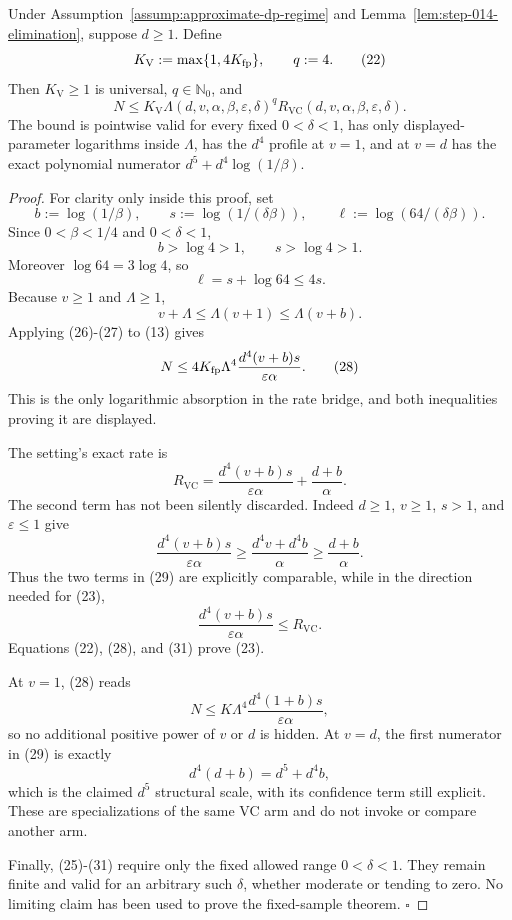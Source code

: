 \begin{proposition}\label{prop:step-014-rate}
Under Assumption~\ref{assump:approximate-dp-regime} and
Lemma~\ref{lem:step-014-elimination}, suppose \(d\geq1\). Define
\[
 K_{\mathrm V}:=\max\{1,4K_{\rm fp}\},
 \qquad q:=4.
\tag{22}
\]
Then \(K_{\mathrm V}\geq1\) is universal, \(q\in\mathbb N_0\), and
\[
 N\leq
 K_{\mathrm V}\Lambda(d,v,\alpha,\beta,\varepsilon,\delta)^q
 R_{\mathrm{VC}}(d,v,\alpha,\beta,\varepsilon,\delta).
\tag{23}
\]
The bound is pointwise valid for every fixed \(0<\delta<1\), has only
displayed-parameter logarithms inside \(\Lambda\), has the \(d^4\) profile
at \(v=1\), and at \(v=d\) has the exact polynomial numerator
\(d^5+d^4\log(1/\beta)\).


\end{proposition}

\begin{proof}
For clarity only inside this proof, set
\[
 b:=\log(1/\beta),\qquad
 s:=\log(1/(\delta\beta)),\qquad
 \ell:=\log(64/(\delta\beta)).
\tag{24}
\]
Since \(0<\beta<1/4\) and \(0<\delta<1\),
\[
 b>\log4>1,\qquad s>\log4>1.
\tag{25}
\]
Moreover \(\log64=3\log4\), so
\[
 \ell=s+\log64\leq4s.
\tag{26}
\]
Because \(v\geq1\) and \(\Lambda\geq1\),
\[
 v+\Lambda\leq\Lambda(v+1)\leq\Lambda(v+b).
\tag{27}
\]
Applying (26)-(27) to (13) gives
\[
 N
 \leq
 4K_{\rm fp}\Lambda^4
 \frac{d^4(v+b)s}{\varepsilon\alpha}.
\tag{28}
\]
This is the only logarithmic absorption in the rate bridge, and both
inequalities proving it are displayed.

The setting's exact rate is
\[
 R_{\mathrm{VC}}
 =
 \frac{d^4(v+b)s}{\varepsilon\alpha}
 +\frac{d+b}{\alpha}.
\tag{29}
\]
The second term has not been silently discarded. Indeed
\(d\geq1\), \(v\geq1\), \(s>1\), and \(\varepsilon\leq1\) give
\[
 \frac{d^4(v+b)s}{\varepsilon\alpha}
 \geq
 \frac{d^4v+d^4b}{\alpha}
 \geq
 \frac{d+b}{\alpha}.
\tag{30}
\]
Thus the two terms in (29) are explicitly comparable, while in the
direction needed for (23),
\[
 \frac{d^4(v+b)s}{\varepsilon\alpha}
 \leq R_{\mathrm{VC}}.
\tag{31}
\]
Equations (22), (28), and (31) prove (23).

At \(v=1\), (28) reads
\[
 N\leq
 K\Lambda^4
 \frac{d^4(1+b)s}{\varepsilon\alpha},
\tag{32}
\]
so no additional positive power of \(v\) or \(d\) is hidden. At \(v=d\),
the first numerator in (29) is exactly
\[
 d^4(d+b)=d^5+d^4b,
\tag{33}
\]
which is the claimed \(d^5\) structural scale, with its confidence term
still explicit. These are specializations of the same VC arm and do not
invoke or compare another arm.

Finally, (25)-(31) require only the fixed allowed range \(0<\delta<1\).
They remain finite and valid for an arbitrary such \(\delta\), whether
moderate or tending to zero. No limiting claim has been used to prove the
fixed-sample theorem. \(\square\)


\end{proof}


